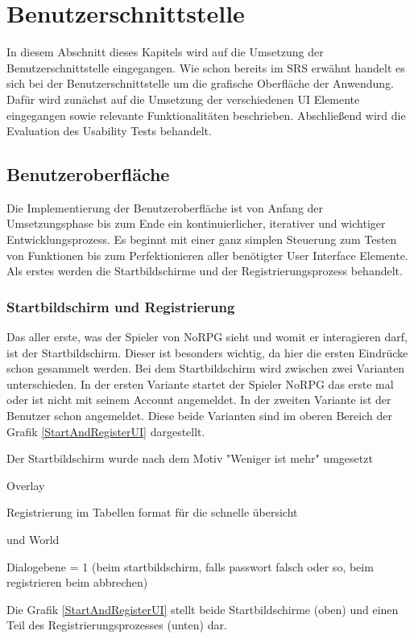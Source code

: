 \section{Benutzerschnittstelle}
	In diesem Abschnitt dieses Kapitels wird auf die Umsetzung der Benutzerschnittstelle eingegangen. Wie schon bereits im SRS erwähnt handelt es sich bei der Benutzerschnittstelle um die grafische Oberfläche der Anwendung. Dafür wird zunächst auf die Umsetzung der verschiedenen UI Elemente eingegangen sowie relevante Funktionalitäten beschrieben. Abschließend wird die Evaluation des Usability Tests behandelt. 
		
	\subsection{Benutzeroberfläche}	
		Die Implementierung der Benutzeroberfläche ist von Anfang der Umsetzungsphase bis zum Ende ein kontinuierlicher, iterativer und wichtiger Entwicklungsprozess. Es beginnt mit einer ganz simplen Steuerung zum Testen von Funktionen bis zum Perfektionieren aller benötigter User Interface Elemente. Als erstes werden die Startbildschirme und der Registrierungsprozess behandelt. 
		
		\subsubsection{Startbildschirm und Registrierung}
			Das aller erste, was der Spieler von NoRPG sieht und womit er interagieren darf, ist der Startbildschirm. Dieser ist besonders wichtig, da hier die ersten Eindrücke schon gesammelt werden. Bei dem Startbildschirm wird zwischen zwei Varianten unterschieden. In der ersten Variante startet der Spieler NoRPG das erste mal oder ist nicht mit seinem Account angemeldet. In der zweiten Variante ist der Benutzer schon angemeldet. Diese beide Varianten sind im oberen Bereich der Grafik \ref{StartAndRegisterUI} dargestellt.
			
			Der Startbildschirm wurde nach dem Motiv "Weniger ist mehr" umgesetzt 
		
			Overlay
			
			Registrierung im Tabellen format für die schnelle übersicht
			
			und World
			
			Dialogebene = 1 (beim startbildschirm, falls passwort falsch oder so, beim registrieren beim abbrechen)
			
			Die Grafik \ref{StartAndRegisterUI} stellt beide Startbildschirme (oben) und einen Teil des Registrierungsprozesses (unten) dar. 
			
